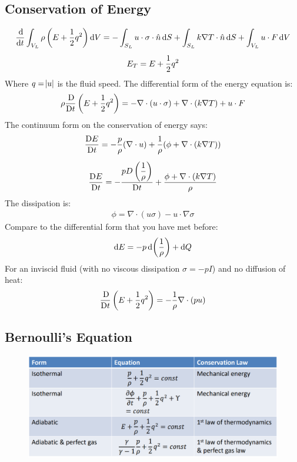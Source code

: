 \subsection{Conservation of Energy}
\begin{gather}
    \frac{\dif}{\dif t} \int_{V_L} \rho \left( E + \frac{1}{2}q^2 \right) \dif V = -\int_{S_L} u \cdot \sigma \cdot \hat{n} \dif S + \int_{S_L} k \nabla T \cdot \hat{n} \dif S + \int_{V_L} u \cdot F \dif V \\[5pt]
    E_T = E + \frac{1}{2}q^2
\end{gather}
Where $q = \abs{u}$ is the fluid speed. The differential form of the energy equation is:
\begin{gather}
    \rho \frac{\Dif}{\Dif t} \left( E + \frac{1}{2}q^2 \right) = -\nabla \cdot (u \cdot \sigma) + \nabla \cdot (k\nabla T) + u \cdot F
\end{gather}
The continuum form on the conservation of energy says:
\begin{gather}
    \frac{\Dif E}{\Dif t} = -\frac{p}{\rho}(\nabla\cdot u) + \frac{1}{\rho}(\phi + \nabla \cdot (k\nabla T)) \\[5pt]
    \frac{\Dif E}{\Dif t} = -\dfrac{pD\left(\dfrac{1}{\rho}\right)}{\Dif t} + \frac{\phi + \nabla \cdot (k\nabla T)}{\rho}
\end{gather}
The dissipation is:
\begin{gather}
    \phi = \nabla \cdot (u\sigma) - u\cdot \nabla \sigma
\end{gather}
Compare to the differential form that you have met before:
\begin{gather}
    \dif E = -p \dif \left(\frac{1}{\rho}\right) + \dif Q
\end{gather}
For an inviscid fluid (with no viscous dissipation $\sigma = -pI$) and no diffusion of heat:
\begin{gather}
    \frac{\Dif}{\Dif t} \left( E + \frac{1}{2}q^2 \right) = -\frac{1}{\rho}\nabla \cdot (pu)
\end{gather}
\subsection{Bernoulli’s Equation}
\begin{figure}[H]
    \centering
    \includegraphics[width = 0.95 \textwidth]{./img/diagram3.PNG}
    \caption{}
\end{figure}
